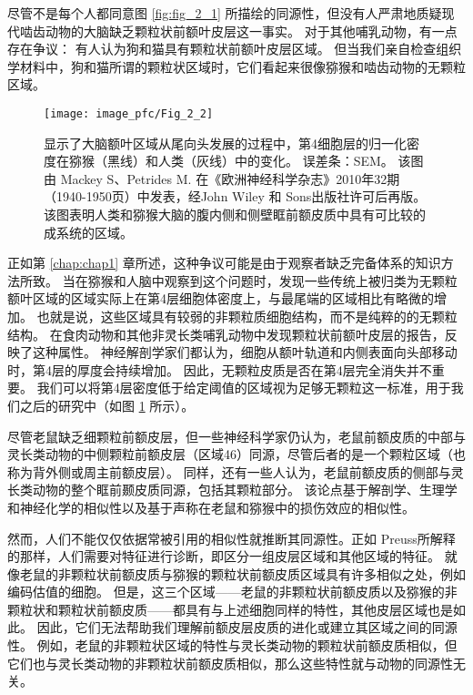 尽管不是每个人都同意图 \ref{fig:fig_2_1} 所描绘的同源性，但没有人严肃地质疑现代啮齿动物的大脑缺乏颗粒状前额叶皮层这一事实。
对于其他哺乳动物，有一点存在争议：
有人认为狗\cite{rajkowska1988intrinsic}和猫\cite{je1948orbitofrontal}具有颗粒状前额叶皮层区域。
但当我们亲自检查组织学材料中，狗和猫所谓的颗粒状区域时，它们看起来很像猕猴和啮齿动物的无颗粒区域。


\begin{figure}[!htb]
	\centering
	\texttt{[image: image\_pfc/Fig\_2\_2]}
	\caption{显示了大脑额叶区域从尾向头发展的过程中，第4细胞层的归一化密度在猕猴（黑线）和人类（灰线）中的变化。
		误差条：SEM。
		该图由 Mackey S、Petrides M. 在《欧洲神经科学杂志》2010年32期（1940-1950页）中发表，经John Wiley 和 Sons出版社许可后再版。
		该图表明人类和猕猴大脑的腹内侧和侧壁眶前额皮质中具有可比较的成系统的区域。\label{fig:fig_2_2}}
\end{figure}


正如第 \ref{chap:chap1} 章所述，这种争议可能是由于观察者缺乏完备体系的知识方法所致。
当在猕猴和人脑中观察到这个问题时\cite{mackey2010quantitative}，发现一些传统上被归类为无颗粒额叶区域的区域实际上在第4层细胞体密度上，与最尾端的区域相比有略微的增加。
也就是说，这些区域具有较弱的非颗粒质细胞结构，而不是纯粹的的无颗粒结构。
在食肉动物和其他非灵长类哺乳动物中发现颗粒状前额叶皮层的报告，反映了这种属性。
神经解剖学家们都认为，细胞从额叶轨道和内侧表面向头部移动时，第4层的厚度会持续增加。
因此，无颗粒皮质是否在第4层完全消失并不重要。
我们可以将第4层密度低于给定阈值的区域视为足够无颗粒这一标准，用于我们之后的研究中（如图 \ref{fig:fig_2_2} 所示）。


尽管老鼠缺乏细颗粒前额皮层，但一些神经科学家仍认为，老鼠前额皮质的中部与灵长类动物的中侧颗粒前额皮层（区域46）同源\cite{kolb2007all}，尽管后者的是一个颗粒区域（也称为背外侧或周主前额皮层）。
同样，还有一些人认为，老鼠前额皮质的侧部与灵长类动物的整个眶前颞皮质同源，包括其颗粒部分\cite{kolb2007all,schoenbaum2009new}。
该论点基于解剖学、生理学和神经化学的相似性以及基于声称在老鼠和猕猴中的损伤效应的相似性。


然而，人们不能仅仅依据常被引用的相似性就推断其同源性。正如 Preuss\cite{preuss1995rats}所解释的那样，人们需要对特征进行诊断，即区分一组皮层区域和其他区域的特征。
就像老鼠的非颗粒状前额皮质与猕猴的颗粒状前额皮质区域具有许多相似之处，例如编码估值的细胞。
但是，这三个区域——老鼠的非颗粒状前额皮质以及猕猴的非颗粒状和颗粒状前额皮质——都具有与上述细胞同样的特性，其他皮层区域也是如此。
因此，它们无法帮助我们理解前额皮层皮质的进化或建立其区域之间的同源性。
例如，老鼠的非颗粒状区域的特性与灵长类动物的颗粒状前额皮质相似，但它们也与灵长类动物的非颗粒状前额皮质相似，那么这些特性就与动物的同源性无关。


